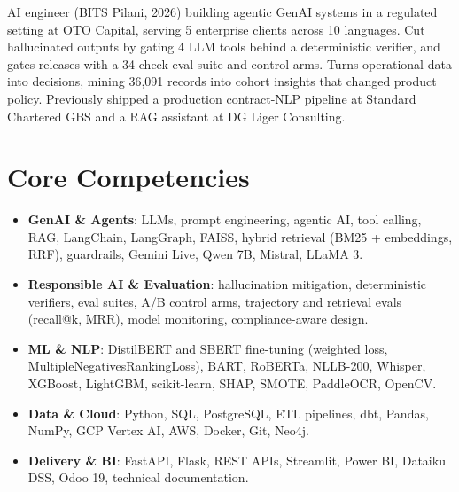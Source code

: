 \documentclass[11pt,a4paper,sans]{moderncv}
\begin{document}
\makecvtitle

\vspace{6pt}
\small{AI engineer (BITS Pilani, 2026) building agentic GenAI systems in a regulated setting at OTO Capital, serving 5 enterprise clients across 10 languages. Cut hallucinated outputs by gating 4 LLM tools behind a deterministic verifier, and gates releases with a 34-check eval suite and control arms. Turns operational data into decisions, mining 36,091 records into cohort insights that changed product policy. Previously shipped a production contract-NLP pipeline at Standard Chartered GBS and a RAG assistant at DG Liger Consulting.}

\section{Core Competencies}
\vspace{1pt}
\begin{itemize}
\item \textbf{GenAI \& Agents}: LLMs, prompt engineering, agentic AI, tool calling, RAG, LangChain, LangGraph, FAISS, hybrid retrieval (BM25 + embeddings, RRF), guardrails, Gemini Live, Qwen 7B, Mistral, LLaMA 3.
\item \textbf{Responsible AI \& Evaluation}: hallucination mitigation, deterministic verifiers, eval suites, A/B control arms, trajectory and retrieval evals (recall@k, MRR), model monitoring, compliance-aware design.
\item \textbf{ML \& NLP}: DistilBERT and SBERT fine-tuning (weighted loss, MultipleNegativesRankingLoss), BART, RoBERTa, NLLB-200, Whisper, XGBoost, LightGBM, scikit-learn, SHAP, SMOTE, PaddleOCR, OpenCV.
\item \textbf{Data \& Cloud}: Python, SQL, PostgreSQL, ETL pipelines, dbt, Pandas, NumPy, GCP Vertex AI, AWS, Docker, Git, Neo4j.
\item \textbf{Delivery \& BI}: FastAPI, Flask, REST APIs, Streamlit, Power BI, Dataiku DSS, Odoo 19, technical documentation.
\end{itemize}
\end{document}
